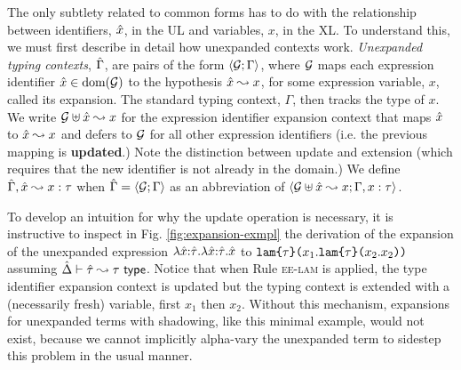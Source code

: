 \documentclass[acmsmall,review,anonymous]{acmart}\settopmatter{printfolios=true,printccs=false,printacmref=false}
\begin{document}




The only subtlety related to common forms has to do with the relationship between identifiers, ${\hat x}$, in the UL and variables, $x$, in the XL. To understand this, we must first describe in detail how unexpanded contexts work. \emph{Unexpanded typing contexts}, $\hat{\Gamma}$, are pairs of the form $\langle \mathcal{G}; \Gamma \rangle$, where $\mathcal{G}$ maps each expression identifier ${\hat x} \in \text{dom}(\mathcal{G})$ to the hypothesis ${\hat x} \leadsto x$, for some expression variable, $x$, called its expansion. The standard typing context, $\Gamma$, then tracks the type of $x$. We write $\mathcal{G} \uplus {\hat x} \leadsto x$ for the expression identifier expansion context that maps ${\hat x}$ to ${\hat x} \leadsto x$ and defers to $\mathcal{G}$ for all other expression identifiers (i.e. the previous mapping is \textbf{updated}.) Note the distinction between update and extension (which requires that the new identifier is not already in the domain.) %
We define $\hat{\Gamma}, {\hat x} \leadsto x : \tau$ when $\hat{\Gamma} = \langle \mathcal{G}; \Gamma \rangle$ as an abbreviation of $\langle \mathcal{G} \uplus {\hat x} \leadsto x; \Gamma, x : \tau \rangle$. 

To develop an intuition for why the update operation is necessary, it is instructive to inspect in Fig. \ref{fig:expansion-exmpl} the derivation of the expansion of the unexpanded expression $\lambda {\hat x}{:}{\hat\tau}.\lambda {\hat x}{:}{\hat\tau}.{\hat x}$ to $\texttt{lam}\texttt{\{}\tau\texttt{\}(}x_1.\texttt{lam}\texttt{\{}\tau\texttt{\}(}x_2.x_2\texttt{)}\texttt{)}$ assuming $\hat{\Delta} \vdash {\hat\tau} \leadsto \tau~\mathsf{type}$. Notice that when Rule \textsc{ee-lam} is applied, the type identifier expansion context is updated but the typing context is extended with a (necessarily fresh) variable, first $x_1$ then $x_2$. Without this mechanism, expansions for unexpanded terms with shadowing, like this minimal example, would not exist, because we cannot implicitly alpha-vary the unexpanded term to sidestep this problem in the usual manner.
\end{document}

